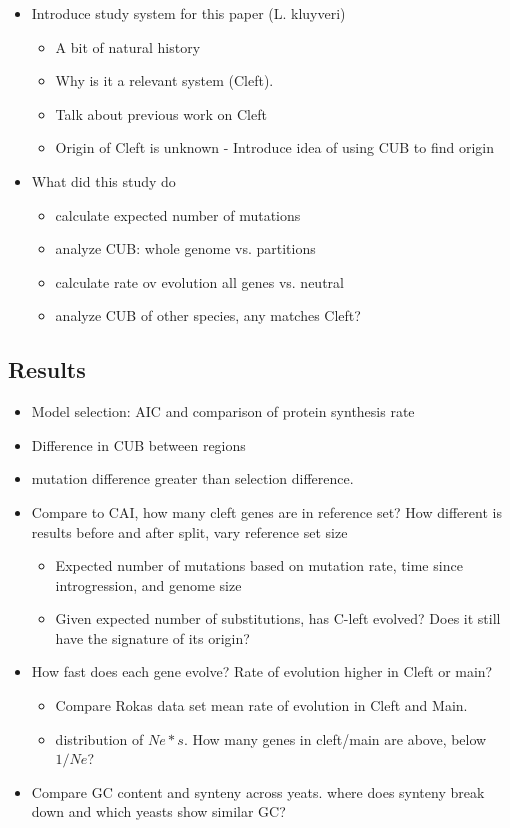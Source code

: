 \documentclass[12pt]{article}
\begin{document}
\begin{itemize}
\begin{itemize}
	\end{itemize}
	\item Introduce study system for this paper (L. kluyveri)
	\begin{itemize}
		\item A bit of natural history
		\item Why is it a relevant system (Cleft).
		\item Talk about previous work on Cleft
		\item Origin of Cleft is unknown - Introduce idea of using CUB to find origin
	\end{itemize}
	\item What did this study do
	\begin{itemize}
		\item calculate expected number of mutations
		\item analyze CUB: whole genome vs. partitions
		\item calculate rate ov evolution all genes vs. neutral
		\item analyze CUB of other species, any matches Cleft?
	\end{itemize}
\end{itemize}

\subsection*{Results}
\begin{itemize}
	\item Model selection: AIC and comparison of protein synthesis rate  
	\item Difference in CUB between regions
	\item mutation difference greater than selection difference.
	\item Compare to CAI, how many cleft genes are in reference set? How different is results before and after split, vary reference set size
	\begin{itemize}
		\item Expected number of mutations based on mutation rate, time since introgression, and genome size
		\item Given expected number of substitutions, has C-left evolved? Does it still have the signature of its origin?
	\end{itemize}
	\item How fast does each gene evolve? Rate of evolution higher in Cleft or main?
	\begin{itemize}
		\item Compare Rokas data set mean rate of evolution in Cleft and Main.
		\item distribution of $Ne*s$. How many genes in cleft/main are above, below $1/Ne$?
	\end{itemize}
	\item Compare GC content and synteny across yeats. where does synteny break down and which yeasts show similar GC?
\end{itemize}
\end{document}
